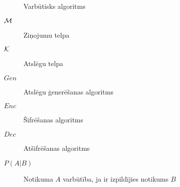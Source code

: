 \begin{description}
    \item[\ppt] Varbūtisks algoritms
    \item[$\mathcal{M}$]Ziņojumu telpa
    \item[$\mathcal{K}$]Atslēgu telpa
    \item[$Gen$]Atslēgu ģenerēšanas algoritms
    \item[$Enc$]Šifrēšanas algoritms
    \item[$Dec$]Atšifrēšanas algoritms
    \item[$P(A|B)$]Notikuma $A$ varbūtība, ja ir izpildījies notikums $B$
\end{description}
